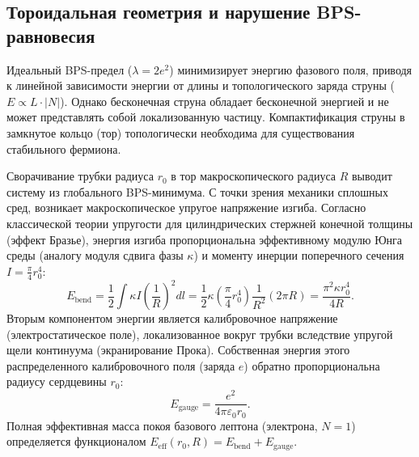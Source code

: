 \documentclass[11pt,a4paper]{article}
\begin{document}
\subsection{Тороидальная геометрия и нарушение BPS-равновесия}
Идеальный BPS-предел ($\lambda = 2e^2$) минимизирует энергию фазового поля, приводя к линейной зависимости энергии от длины и топологического заряда струны ($E \propto L \cdot |N|$). Однако бесконечная струна обладает бесконечной энергией и не может представлять собой локализованную частицу. Компактификация струны в замкнутое кольцо (тор) топологически необходима для существования стабильного фермиона.
	
Сворачивание трубки радиуса $r_0$ в тор макроскопического радиуса $R$ выводит систему из глобального BPS-минимума. С точки зрения механики сплошных сред, возникает макроскопическое упругое напряжение изгиба. Согласно классической теории упругости для цилиндрических стержней конечной толщины (эффект Бразье), энергия изгиба пропорциональна эффективному модулю Юнга среды (аналогу модуля сдвига фазы $\kappa$) и моменту инерции поперечного сечения $I = \frac{\pi}{4} r_0^4$:
\begin{equation}
E_{\text{bend}} = \frac{1}{2} \int \kappa I \left( \frac{1}{R} \right)^2 dl = \frac{1}{2} \kappa \left( \frac{\pi}{4} r_0^4 \right) \frac{1}{R^2} (2\pi R) = \frac{\pi^2 \kappa r_0^4}{4R}.
\label{eq:ebend}
\end{equation}
Вторым компонентом энергии является калибровочное напряжение (электростатическое поле), локализованное вокруг трубки вследствие упругой щели континуума (экранирование Прока). Собственная энергия этого распределенного калибровочного поля (заряда $e$) обратно пропорциональна радиусу сердцевины $r_0$:
\begin{equation}
E_{\text{gauge}} = \frac{e^2}{4\pi\varepsilon_0 r_0}.
\label{eq:egauge}
\end{equation}
Полная эффективная масса покоя базового лептона (электрона, $N=1$) определяется функционалом $E_{\text{eff}}(r_0, R) = E_{\text{bend}} + E_{\text{gauge}}$.
	
\end{document}
